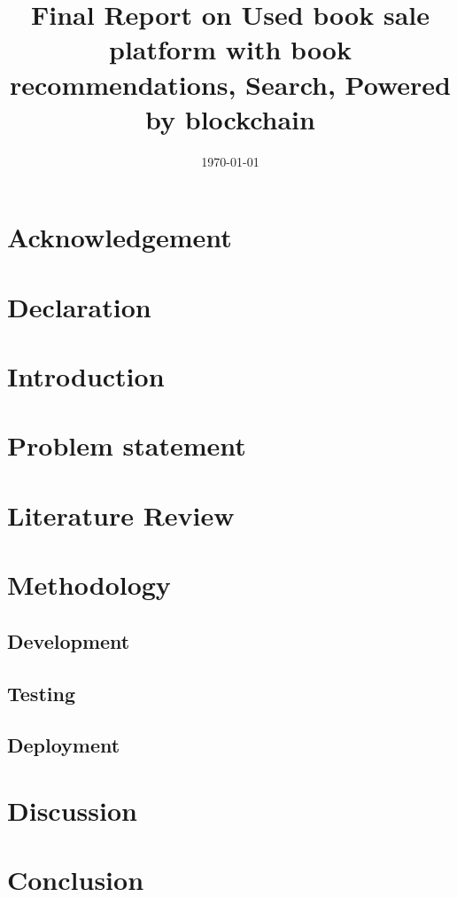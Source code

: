 \documentclass{article}
\title{Final Report on Used book sale platform with book recommendations, Search, Powered by blockchain}
\date{\today}
\begin{document}
\maketitle

\begin{abstract}
    
\end{abstract}

\newpage

\section*{Acknowledgement}
    
\newpage

\section*{Declaration}
    
\newpage

\tableofcontents
\newpage

\section{Introduction}
    

\section{Problem statement}
    

\section{Literature Review}
    

\section{Methodology}
    

\subsection{Development}
    

\subsection{Testing}
    
\newpage

\subsection{Deployment}
    

\section{Discussion}
    

\section{Conclusion}
    


    
\newpage

\appendix
    
    \newpage
    
\end{document}
